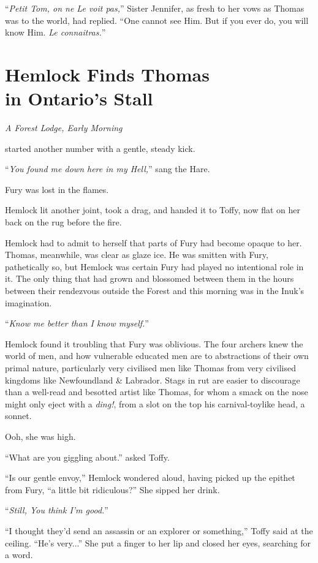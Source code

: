\documentclass[11pt,a5paper]{article}
\newcommand{\alet}[1]{\textit{#1}\vspace{1em}}
\begin{document}
``\emph{Petit Tom, on ne Le voit pas,}'' Sister Jennifer, as fresh to her vows as Thomas was to the world, had replied. ``One cannot see Him. But if you ever do, you will know Him. \emph{Le connaitras.}''

\newpage

\section{Hemlock Finds Thomas\\ in Ontario's Stall}

\alet{A Forest Lodge, Early Morning}

 started another number with a gentle, steady kick.

``\emph{You found me down here in my Hell,}'' sang the Hare.

Fury was lost in the flames.

Hemlock lit another joint, took a drag, and handed it to Toffy, now flat on her back on the rug before the fire.

Hemlock had to admit to herself that parts of Fury had become opaque to her. Thomas, meanwhile, was clear as glaze ice. He was smitten with Fury, pathetically so, but Hemlock was certain Fury had played no intentional role in it. The only thing that had grown and blossomed between them in the hours between their rendezvous outside the Forest and this morning was in the Inuk's imagination.

``\emph{Know me better than I know myself.}''

Hemlock found it troubling that Fury was oblivious. The four archers knew the world of men, and how vulnerable educated men are to abstractions of their own primal nature, particularly very civilised men like Thomas from very civilised kingdoms like Newfoundland \& Labrador. Stags in rut are easier to discourage than a well-read and besotted artist like Thomas, for whom a smack on the nose might only eject with a \emph{ding!}, from a slot on the top his carnival-toylike head, a sonnet.

Ooh, she was high.

``What are you giggling about.'' asked Toffy.

``Is our gentle envoy,'' Hemlock wondered aloud, having picked up the epithet from Fury, ``a little bit ridiculous?'' She sipped her drink.

``\emph{Still, You think I'm good.}''

``I thought they'd send an assassin or an explorer or something,'' Toffy said at the ceiling. ``He's very...'' She put a finger to her lip and closed her eyes, searching for a word.
\end{document}
